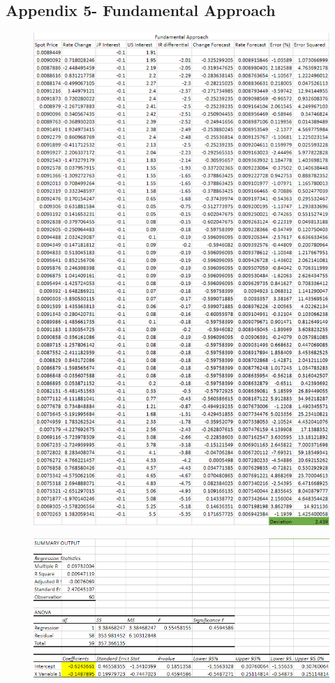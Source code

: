 \documentclass{article}
\let\Oldsubsection\subsection
\renewcommand{\subsection}{\FloatBarrier\Oldsubsection}
\begin{document}
\break

\subsection*{Appendix 5- Fundamental Approach}


\begin{figure}[h!]
    \centering
    \includegraphics[scale=0.5]{graphs/app5.png}
\end{figure}


\begin{figure}[h!]
    \centering
    \includegraphics[scale=0.5]{graphs/app5(1).png}
\end{figure}
\end{document}
